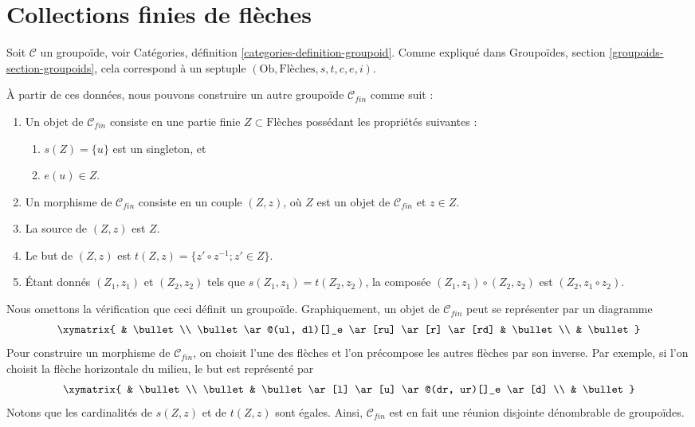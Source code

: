 \section{Collections finies de flèches}
\label{section-finite-set-arrows}

\noindent
Soit $\mathcal{C}$ un groupoïde, voir
Catégories, définition \ref{categories-definition-groupoid}.
Comme expliqué dans
Groupoïdes, section \ref{groupoids-section-groupoids},
cela correspond à un septuple $(\text{Ob}, \text{Flèches}, s, t, c, e, i)$.

\medskip\noindent
À partir de ces données, nous pouvons construire un autre groupoïde
$\mathcal{C}_{fin}$ comme suit :
\begin{enumerate}
\item Un objet de $\mathcal{C}_{fin}$ consiste en une partie finie
$Z \subset \text{Flèches}$ possédant les propriétés suivantes :
\begin{enumerate}
\item $s(Z) = \{u\}$ est un singleton, et
\item $e(u) \in Z$.
\end{enumerate}
\item Un morphisme de $\mathcal{C}_{fin}$ consiste en un couple
$(Z, z)$, où $Z$ est un objet de $\mathcal{C}_{fin}$ et
$z \in Z$.
\item La source de $(Z, z)$ est $Z$.
\item Le but de $(Z, z)$ est $t(Z, z) = \{z' \circ z^{-1}; z' \in Z\}$.
\item Étant donnés $(Z_1, z_1)$ et $(Z_2, z_2)$ tels que
$s(Z_1, z_1) = t(Z_2, z_2)$, la composée $(Z_1, z_1) \circ (Z_2, z_2)$ est $(Z_2, z_1 \circ z_2)$.
\end{enumerate}
Nous omettons la vérification que ceci définit un groupoïde.
Graphiquement, un objet de $\mathcal{C}_{fin}$ peut se représenter
par un diagramme
$$
\xymatrix{
& \bullet \\
\bullet \ar@(ul, dl)[]_e \ar[ru] \ar[r] \ar[rd] & \bullet \\
& \bullet
}
$$
Pour construire un morphisme de $\mathcal{C}_{fin}$, on choisit l'une des
flèches et l'on précompose les autres flèches par son inverse. Par exemple,
si l'on choisit la flèche horizontale du milieu, le but est représenté par
$$
\xymatrix{
& \bullet \\
\bullet & \bullet \ar[l] \ar[u] \ar@(dr, ur)[]_e \ar[d] \\
& \bullet
}
$$
Notons que les cardinalités de $s(Z, z)$ et de $t(Z, z)$ sont égales.
Ainsi, $\mathcal{C}_{fin}$ est en fait une réunion disjointe dénombrable
de groupoïdes.




